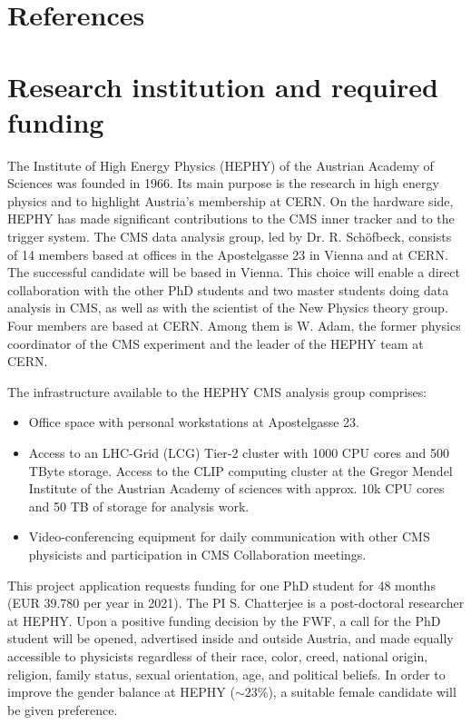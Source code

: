 \documentclass[a4paper,11pt]{article}
\begin{document}
\appendix
\renewcommand{\thesection}{Annex \arabic{section}} 

\clearpage
\section{References}
\renewcommand{\refname}{}
{
%


}

\newpage

\section{Research institution and required funding}

The Institute of High Energy Physics (HEPHY) of the Austrian Academy of Sciences was founded in 1966. 
Its main purpose is the research in high energy physics and to highlight Austria's membership at CERN. 
On the hardware side, HEPHY has made significant contributions to the CMS inner tracker and to the trigger system. 
The CMS data analysis group, led by Dr. R. Sch{\"o}fbeck, consists of 14 members based at offices in the Apostelgasse 23 in Vienna and at CERN. The successful candidate will be based in Vienna. 
This choice will enable a direct collaboration with the other PhD students and two master students doing data analysis in CMS, as well as with the scientist of the New Physics theory group.
Four members are based at CERN. 
Among them is  W.  Adam, the former physics coordinator of the CMS experiment and the leader of the HEPHY team at CERN.

The infrastructure available to the HEPHY CMS analysis group comprises:
\begin{itemize}
\item Office space with personal workstations at Apostelgasse 23.
\item Access to an LHC-Grid (LCG) Tier-2 cluster with 1000 CPU cores and 500 TByte storage. Access to the CLIP computing cluster at the Gregor Mendel Institute of the Austrian Academy of sciences with approx. 10k CPU cores and 50 TB of
storage for analysis work.
\item Video-conferencing equipment for daily communication with other CMS physicists and participation in CMS Collaboration meetings.
\end{itemize}

This project application requests funding for one PhD student for 48
months (EUR 39.780 per year in 2021). 
The PI S. Chatterjee is a post-doctoral researcher at HEPHY.
Upon a positive funding decision by the FWF, a call for the PhD student will be opened, advertised inside and outside Austria, and made equally accessible to physicists regardless of their race, color, creed, national origin, religion, family status, sexual orientation, age, and political beliefs. 
In order to improve the gender balance at HEPHY ($\sim 23\%$), a suitable female candidate will be given preference.
\end{document}
